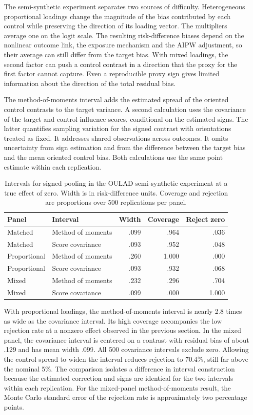 The semi-synthetic experiment separates two sources of difficulty. Heterogeneous proportional loadings change the magnitude of the bias contributed by each control while preserving the direction of its loading vector. The multipliers average one on the logit scale. The resulting risk-difference biases depend on the nonlinear outcome link, the exposure mechanism and the AIPW adjustment, so their average can still differ from the target bias. With mixed loadings, the second factor can push a control contrast in a direction that the proxy for the first factor cannot capture. Even a reproducible proxy sign gives limited information about the direction of the total residual bias.

The method-of-moments interval adds the estimated spread of the oriented control contrasts to the target variance. A second calculation uses the covariance of the target and control influence scores, conditional on the estimated signs. The latter quantifies sampling variation for the signed contrast with orientations treated as fixed. It addresses shared observations across outcomes. It omits uncertainty from sign estimation and from the difference between the target bias and the mean oriented control bias. Both calculations use the same point estimate within each replication.

\begin{table}[htbp]
\centering\small
\caption{Intervals for signed pooling in the OULAD semi-synthetic experiment at a true effect of zero. Width is in risk-difference units. Coverage and rejection are proportions over 500 replications per panel.}
\begin{tabular}{llrrr}
\toprule
Panel & Interval & Width & Coverage & Reject zero\\
\midrule
Matched & Method of moments & .099 & .964 & .036\\
Matched & Score covariance & .093 & .952 & .048\\
Proportional & Method of moments & .260 & 1.000 & .000\\
Proportional & Score covariance & .093 & .932 & .068\\
Mixed & Method of moments & .232 & .296 & .704\\
Mixed & Score covariance & .099 & .000 & 1.000\\
\bottomrule
\end{tabular}
\end{table}

With proportional loadings, the method-of-moments interval is nearly 2.8 times as wide as the covariance interval. Its high coverage accompanies the low rejection rate at a nonzero effect observed in the previous section. In the mixed panel, the covariance interval is centered on a contrast with residual bias of about .129 and has mean width .099. All 500 covariance intervals exclude zero. Allowing the control spread to widen the interval reduces rejection to 70.4\%, still far above the nominal 5\%. The comparison isolates a difference in interval construction because the estimated correction and signs are identical for the two intervals within each replication. For the mixed-panel method-of-moments result, the Monte Carlo standard error of the rejection rate is approximately two percentage points.

